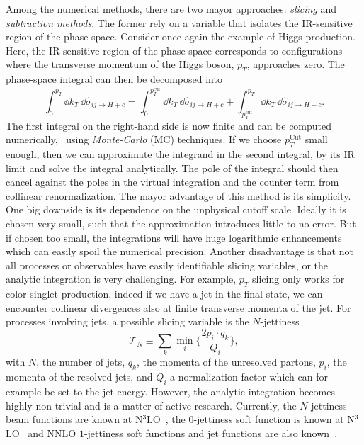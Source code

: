 Among the numerical methods, there are two mayor approaches: \textit{slicing} and \textit{subtraction methods}. The former rely on a variable that isolates the \acs{IR}-sensitive region of the phase space. Consider once again the example of Higgs production. Here, the IR-sensitive region of the phase space corresponds to configurations where the transverse momentum of the Higgs boson, $p_T$, approaches zero. The phase-space integral can then be decomposed into
\begin{equation}
\int_0^{p_T} \dd k_T \, \dd \hat{\sigma}_{ij \rightarrow H + c} = \int_0^{p_T^\text{cut}} \dd k_T \, \dd \hat{\sigma}_{ij \rightarrow H + c} + \int_{p_T^\text{cut}}^{p_T} \dd k_T \, \dd \hat{\sigma}_{ij \rightarrow H + c}.
\end{equation}
The first integral on the right-hand side is now finite and can be computed numerically, \eg\ using \textit{Monte-Carlo} (\acs{MC}) techniques. If we choose $p_T^{\text{Cut}}$ small enough, then we can approximate the integrand in the second integral, by its \acs{IR} limit and solve the integral analytically. The pole of the integral should then cancel against the poles in the virtual integration and the counter term from collinear renormalization. The mayor advantage of this method is its simplicity. One big  downside is its dependence on the unphysical cutoff scale. Ideally it is chosen very small, such that the approximation introduces little to no error. But if chosen too small, the integrations will have huge logarithmic enhancements which can easily spoil the numerical precision. Another disadvantage is that not all processes or observables have easily identifiable slicing variables, or the analytic integration is very challenging. For example, $p_T$ slicing only works for color singlet production, indeed if we have a jet in the final state, we can encounter collinear divergences also at finite transverse momenta of the jet. For processes involving jets, a possible slicing variable is the $N$-jettiness
\begin{equation}
\mathcal{T}_N \equiv \sum_k \min_i\! \bigg \lbrace \frac{2 p_i \cdot q_k}{Q_i} \bigg \rbrace,
\end{equation}
with $N$, the number of jets, $q_k$, the momenta of the unresolved partons, $p_i$, the momenta of the resolved jets, and $Q_i$ a normalization factor which can for example be set to the jet energy. However, the analytic integration becomes highly non-trivial and is a matter of active research. Currently, the $N$-jettiness beam functions are known at N${}^3$LO~\cite{Ebert:2020unb}, the $0$-jettiness soft function is known at N${}^3$LO~\cite{Baranowski:2024vxg, Baranowski:2024ysi} and \acs{NNLO} $1$-jettiness soft functions and jet functions are also known~\cite{Campbell:2017hsw, Becher:2010pd, Becher:2006qw, Boughezal:2015eha}.


